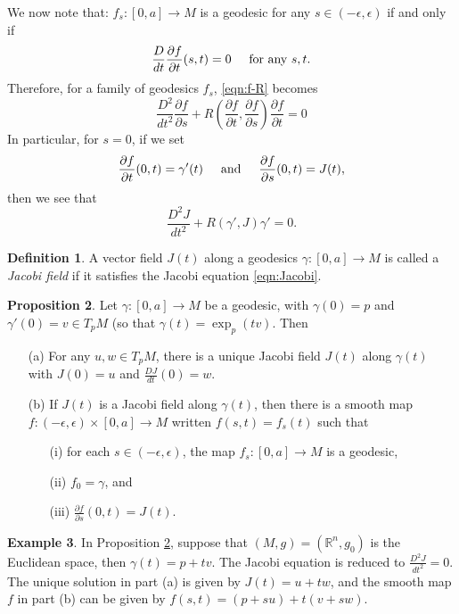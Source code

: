 \documentclass{amsart}
\numberwithin{equation}{section}
\theoremstyle{definition}
\newtheorem{definition}{Definition} [section]
\newtheorem{example}[definition]{Example}
\theoremstyle{theorem}
\newtheorem{proposition}[definition]{Proposition}
\begin{document}
We now note that: $f_s : [0,a] \to M$ is a geodesic for any $s\in (-\epsilon,\epsilon)$  if and only if 
\[
\frac{D}{dt}\frac{\partial f}{\partial t}(s,t) = 0 \hspace{5mm} \text{for any $s,t$}. 
\]
Therefore, for a family of geodesics $f_s$, \eqref{eqn:f-R} becomes
\[
\frac{D^2}{dt^2} \frac{\partial f}{\partial s} + R(\frac{\partial f}{\partial t}, \frac{\partial f}{\partial s}) \frac{\partial f}{\partial t} = 0
\]
In particular, for $s = 0$, if we set 
\[
\frac{\partial f}{\partial t}(0,t) = \gamma'(t) \hspace{5mm} \text{and} \hspace{5mm} \frac{\partial f}{\partial s}(0,t) = J(t),
\]
then we see that 
\begin{equation}\label{eqn:Jacobi}
\boxed{\frac{D^2J}{dt^2} + R(\gamma', J)\gamma' = 0.}
\end{equation}

\begin{definition}
A vector field $J(t)$ along a geodesics $\gamma : [0,a] \to M$ is called a {\em Jacobi field} if it satisfies 
the Jacobi equation \eqref{eqn:Jacobi}. 
\end{definition}

\begin{proposition}\label{jacobi}
Let $\gamma : [0,a] \to M$ be a geodesic, with $\gamma(0) = p$ and $\gamma'(0) = v \in T_pM$ (so that $\gamma(t)=\exp_p(tv)$. Then 
\begin{enumerate}
\item[(a)] For any $u,w \in T_pM$, there is a unique Jacobi field $J(t)$ along $\gamma(t)$ with $J(0) = u$ and $\frac{DJ}{dt}(0) = w$. 
\item[(b)] If $J(t)$ is a Jacobi field along $\gamma(t)$, then there is a smooth map $f : (-\epsilon, \epsilon) \times [0,a] \to M$ written $f(s,t) = f_s(t)$ such that 
\begin{enumerate}
\item[(i)] for each $s \in (-\epsilon, \epsilon)$, the map $f_s : [0,a] \to M$ is a geodesic,
\item[(ii)] $f_0 = \gamma$, and 
\item[(iii)] $\frac{\partial f}{\partial s}(0,t) = J(t)$.  
\end{enumerate}
\end{enumerate}
\end{proposition}

\begin{example}
In Proposition \ref{jacobi}, suppose that $(M,g) = (\mathbb{R}^n, g_0)$ is the Euclidean space,
then $\gamma(t) = p + tv$. The Jacobi equation
is reduced to $\frac{D^2J}{dt^2}=0$. The unique solution in part (a)  is given by
$J(t) = u + tw$, and the smooth map $f$ in part (b) can be given by
$f(s,t) = (p + su) + t (v+ sw)$. 
\end{example}
\end{document}

